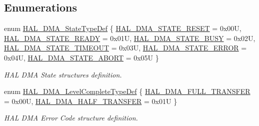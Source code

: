 \subsection*{Enumerations}
\begin{DoxyCompactItemize}
\item 
enum \hyperlink{group___d_m_a___exported___types_ga9c012af359987a240826f29073bbe463}{H\+A\+L\+\_\+\+D\+M\+A\+\_\+\+State\+Type\+Def} \{ \newline
\hyperlink{group___d_m_a___exported___types_gga9c012af359987a240826f29073bbe463a9e7be73da32b8c837cde0318e0d5eed2}{H\+A\+L\+\_\+\+D\+M\+A\+\_\+\+S\+T\+A\+T\+E\+\_\+\+R\+E\+S\+ET} = 0x00U, 
\hyperlink{group___d_m_a___exported___types_gga9c012af359987a240826f29073bbe463ad497944e6e72bc3ca904694b1098105a}{H\+A\+L\+\_\+\+D\+M\+A\+\_\+\+S\+T\+A\+T\+E\+\_\+\+R\+E\+A\+DY} = 0x01U, 
\hyperlink{group___d_m_a___exported___types_gga9c012af359987a240826f29073bbe463af7a0a2ca8de4e5be9e85b6a9073476ef}{H\+A\+L\+\_\+\+D\+M\+A\+\_\+\+S\+T\+A\+T\+E\+\_\+\+B\+U\+SY} = 0x02U, 
\hyperlink{group___d_m_a___exported___types_gga9c012af359987a240826f29073bbe463acf3a5443bf4dc71018512a255e2076eb}{H\+A\+L\+\_\+\+D\+M\+A\+\_\+\+S\+T\+A\+T\+E\+\_\+\+T\+I\+M\+E\+O\+UT} = 0x03U, 
\newline
\hyperlink{group___d_m_a___exported___types_gga9c012af359987a240826f29073bbe463ac2ce65c7cb2410c143b14e309ba83742}{H\+A\+L\+\_\+\+D\+M\+A\+\_\+\+S\+T\+A\+T\+E\+\_\+\+E\+R\+R\+OR} = 0x04U, 
\hyperlink{group___d_m_a___exported___types_gga9c012af359987a240826f29073bbe463af199cdb868cfd96fa97decb285643755}{H\+A\+L\+\_\+\+D\+M\+A\+\_\+\+S\+T\+A\+T\+E\+\_\+\+A\+B\+O\+RT} = 0x05U
 \}\begin{DoxyCompactList}\small\item\em H\+AL D\+MA State structures definition. \end{DoxyCompactList}
\item 
enum \hyperlink{group___d_m_a___exported___types_gaee3245eea8fa938edeb35a6c9596fd86}{H\+A\+L\+\_\+\+D\+M\+A\+\_\+\+Level\+Complete\+Type\+Def} \{ \hyperlink{group___d_m_a___exported___types_ggaee3245eea8fa938edeb35a6c9596fd86a5314147c8ba21548763bf89446b78468}{H\+A\+L\+\_\+\+D\+M\+A\+\_\+\+F\+U\+L\+L\+\_\+\+T\+R\+A\+N\+S\+F\+ER} = 0x00U, 
\hyperlink{group___d_m_a___exported___types_ggaee3245eea8fa938edeb35a6c9596fd86ad0ba8bc74a2ae6dcdc3e316e8be0d5d8}{H\+A\+L\+\_\+\+D\+M\+A\+\_\+\+H\+A\+L\+F\+\_\+\+T\+R\+A\+N\+S\+F\+ER} = 0x01U
 \}\begin{DoxyCompactList}\small\item\em H\+AL D\+MA Error Code structure definition. \end{DoxyCompactList}

\end{DoxyCompactItemize}
